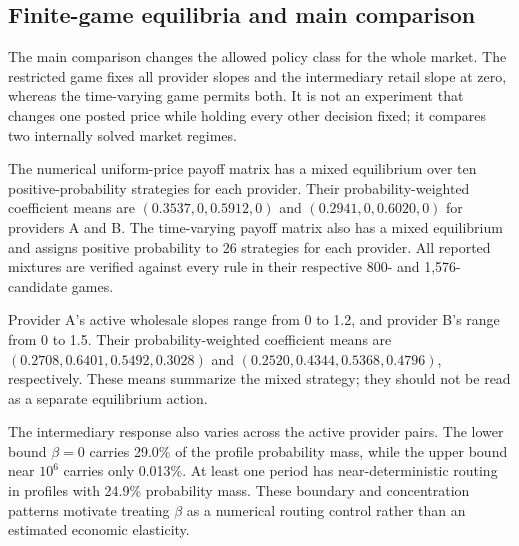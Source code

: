 \documentclass[11pt,a4paper]{article}
\begin{document}
\subsection{Finite-game equilibria and main comparison}

The main comparison changes the allowed policy class for the whole market. The restricted game fixes all provider slopes and the intermediary retail slope at zero, whereas the time-varying game permits both. It is not an experiment that changes one posted price while holding every other decision fixed; it compares two internally solved market regimes.

The numerical uniform-price payoff matrix has a mixed equilibrium over ten positive-probability strategies for each provider. Their probability-weighted coefficient means are $(0.3537,0,0.5912,0)$ and $(0.2941,0,0.6020,0)$ for providers A and B. The time-varying payoff matrix also has a mixed equilibrium and assigns positive probability to 26 strategies for each provider. All reported mixtures are verified against every rule in their respective 800- and 1,576-candidate games.

Provider A's active wholesale slopes range from 0 to 1.2, and provider B's range from 0 to 1.5. Their probability-weighted coefficient means are $(0.2708,0.6401,0.5492,0.3028)$ and $(0.2520,0.4344,0.5368,0.4796)$, respectively. These means summarize the mixed strategy; they should not be read as a separate equilibrium action.

The intermediary response also varies across the active provider pairs. The lower bound $\beta=0$ carries 29.0\% of the profile probability mass, while the upper bound near $10^6$ carries only 0.013\%. At least one period has near-deterministic routing in profiles with 24.9\% probability mass. These boundary and concentration patterns motivate treating $\beta$ as a numerical routing control rather than an estimated economic elasticity.
\end{document}
